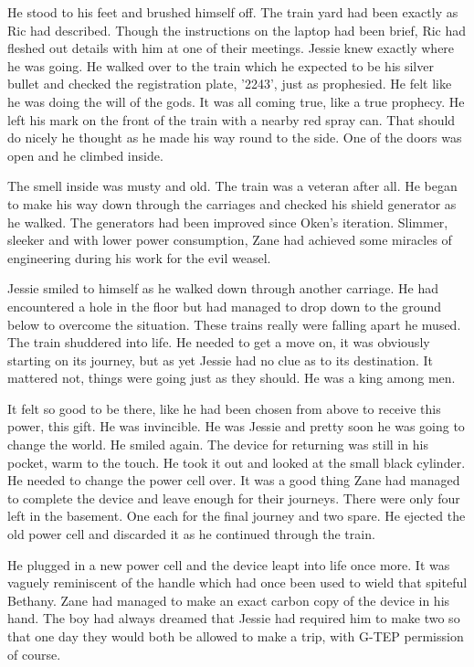 He stood to his feet and brushed himself off.  The train yard had been exactly as Ric had described.  Though the instructions on the laptop had been brief, Ric had fleshed out details with him at one of their meetings.  Jessie knew exactly where he was going.  He walked over to the train which he expected to be his silver bullet and checked the registration plate, '2243', just as prophesied.  He felt like he was doing the will of the gods.  It was all coming true, like a true prophecy.  He left his mark on the front of the train with a nearby red spray can.  That should do nicely he thought as he made his way round to the side.  One of the doors was open and he climbed inside.  

The smell inside was musty and old.  The train was a veteran after all.  He began to make his way down through the carriages and checked his shield generator as he walked.  The generators had been improved since Oken's iteration.  Slimmer, sleeker and with lower power consumption, Zane had achieved some miracles of engineering during his work for the evil weasel.  

Jessie smiled to himself as he walked down through another carriage.  He had encountered a hole in the floor but had managed to drop down to the ground below to overcome the situation.  These trains really were falling apart he mused.  The train shuddered into life.  He needed to get a move on, it was obviously starting on its journey, but as yet Jessie had no clue as to its destination.  It mattered not, things were going just as they should.  He was a king among men.

It felt so good to be there, like he had been chosen from above to receive this power, this gift.  He was invincible.  He was Jessie and pretty soon he was going to change the world.  He smiled again.  The device for returning was still in his pocket, warm to the touch.  He took it out and looked at the small black cylinder.  He needed to change the power cell over.  It was a good thing Zane had managed to complete the device and leave enough for their journeys.  There were only four left in the basement.  One each for the final journey and two spare.  He ejected the old power cell and discarded it as he continued through the train.  

He plugged in a new power cell and the device leapt into life once more.  It was vaguely reminiscent of the handle which had once been used to wield that spiteful Bethany.  Zane had managed to make an exact carbon copy of the device in his hand.  The boy had always dreamed that Jessie had required him to make two so that one day they would both be allowed to make a trip, with G-TEP permission of course.

